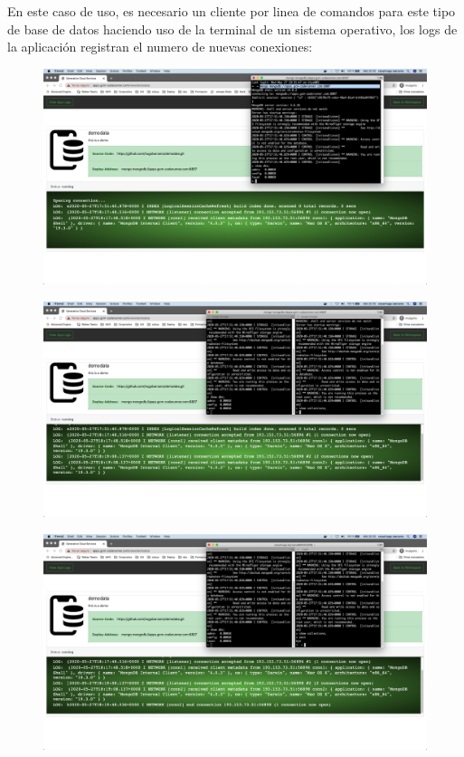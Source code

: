 \documentclass[a4paper,11pt]{book}
\begin{document}
En este caso de uso, es necesario un cliente por linea de comandos para este tipo de base de datos haciendo uso de la terminal de un sistema operativo, los logs de la aplicación registran el numero de nuevas conexiones: 
\begin{figure}[H]
\centering
\includegraphics[scale=0.2]{imagenes/casouso/1_14.png}
\caption{   }
\end{figure}

\begin{figure}[H]
\centering
\includegraphics[scale=0.2]{imagenes/casouso/1_15.png}
\caption{   }
\end{figure}

\begin{figure}[H]
\centering
\includegraphics[scale=0.2]{imagenes/casouso/1_16.png}
\caption{   }
\end{figure}
\end{document}
